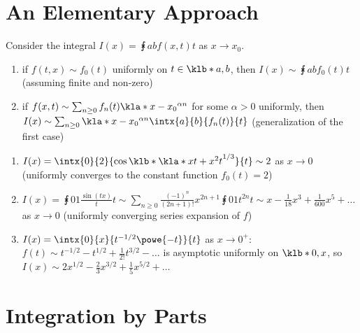 \documentclass[english, parskip=full]{scrbook}
\newcommand{\example}[3]{\begin{tcolorbox}[colback=colorbackgroundexample,colframe=colorexample, breakable,enhanced,title={\textbf{#1}: #2.}]#3\end{tcolorbox}}
\begin{document}
\section{An Elementary Approach}
Consider the integral $I(x) = \intx{a}{b}{f(x,t)}{t}$ as $x\rightarrow x_0$.
\begin{enumerate}
\item if $f(t,x) \sim f_0(t)$ uniformly on $t\in\klb*{a,b}$, then $I(x) \sim \intx{a}{b}{f_0(t)}{t}$ (assuming finite and non-zero)
\item if $f(x,t) \sim \sum_{n\ge 0} f_n(t) \kla*{x-x_0}^{\alpha n}$ for some $\alpha > 0$ uniformly, then $I(x) \sim \sum_{n\ge 0} \kla*{x-x_0}^{\alpha n} \intx{a}{b}{f_n(t)}{t}$ (generalization of the first case)
\end{enumerate}
\example{Three examples}{}{\begin{enumerate}
\item $I(x) = \intx{0}{2}{\cos\klb*{\kla*{xt + x^2t}^{1/3}}}{t} \sim 2$ as $x\rightarrow 0$ (uniformly converges to the constant function $f_0(t)=2$)
\item $I(x) = \intx{0}{1}{\frac{\sin(tx)}{t}}{t} \sim \sum_{n\ge 0} \frac{(-1)^n}{(2n+1)!} x^{2n+1} \intx{0}{1}{t^{2n}}{t} \sim x - \frac{1}{18} x^3 + \frac{1}{600} x^5 + \dots$ as $x\rightarrow 0$ (uniformly converging series expansion of $f$)
\item $I(x) = \intx{0}{x}{t^{-1/2} \powe{-t}}{t}$ as $x\rightarrow 0^+$: $f(t) \sim t^{-1/2} - t^{1/2} + \frac{1}{2!} t^{3/2} - \dots$ is asymptotic uniformly on $\klb*{0,x}$, so $I(x) \sim 2x^{1/2} - \frac{2}{3} x^{3/2} + \frac{1}{5} x^{5/2} + \dots$
\end{enumerate}
}
\section{Integration by Parts}
\end{document}
